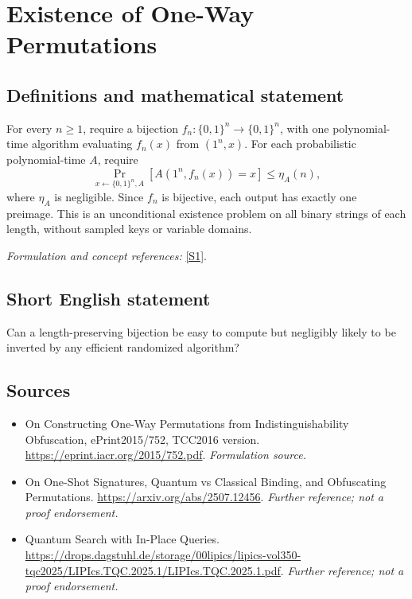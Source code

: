 \documentclass[11pt]{article}
\begin{document}
\section*{\texorpdfstring{Existence of One-Way Permutations}{Existence of One-Way Permutations}}\label{50}
\subsection{Definitions and mathematical statement}
For every $n\ge1$, require a bijection $f_n:\{0,1\}^n\to\{0,1\}^n$, with one polynomial-time algorithm evaluating $f_n(x)$ from $(1^n,x)$. For each probabilistic polynomial-time $A$, require
\[
 \Pr_{x\leftarrow\{0,1\}^n,A}[A(1^n,f_n(x))=x]\le\eta_A(n),
\]
where $\eta_A$ is negligible. Since $f_n$ is bijective, each output has exactly one preimage. This is an unconditional existence problem on all binary strings of each length, without sampled keys or variable domains.
\par\smallskip\textit{Formulation and concept references:} \href{https://eprint.iacr.org/2015/752.pdf}{[S1]}.

\subsection{Short English statement}
Can a length-preserving bijection be easy to compute but negligibly likely to be inverted by any efficient randomized algorithm?
\subsection{Sources}
\begin{itemize}
\item[S1]On Constructing One-Way Permutations from Indistinguishability Obfuscation, ePrint2015/752, TCC2016 version.
\url{https://eprint.iacr.org/2015/752.pdf}.
\textit{Formulation source.}
\item[S2]On One-Shot Signatures, Quantum vs Classical Binding, and Obfuscating Permutations.
\url{https://arxiv.org/abs/2507.12456}.
\textit{Further reference; not a proof endorsement.}
\item[S3]Quantum Search with In-Place Queries.
\url{https://drops.dagstuhl.de/storage/00lipics/lipics-vol350-tqc2025/LIPIcs.TQC.2025.1/LIPIcs.TQC.2025.1.pdf}.
\textit{Further reference; not a proof endorsement.}
\end{itemize}
\end{document}
